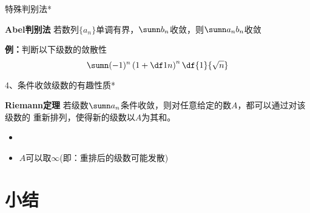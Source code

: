 \begin{frame}{特殊判别法*}
	\linespread{1.5}\pause 
	\begin{block}{{\bf Abel判别法}\hfill}
		若数列$\{a_n\}$单调有界，$\sumn b_n$收敛，则$\sumn a_nb_n$收敛\pause 
	\end{block}
	\bigskip
	\begin{exampleblock}{{\bf 例：}判断以下级数的敛散性\hfill}
		  $$\sumn(-1)^n\left(1+\df 1n\right)^n\df{1}{\sqrt n}$$ 
	\end{exampleblock}
\end{frame}

\begin{frame}{4、条件收敛级数的有趣性质*}
	\linespread{1.2}
	\begin{block}{{\bf Riemann定理}}
		若级数$\sumn a_n$条件收敛，则对任意给定的数$A$，都可以通过对该级数的
		重新排列，使得新的级数以$A$为其和。
	\end{block}
	\pause
	\begin{itemize}
	  \item {}
	  \item $A$可以取$\infty$(即：重排后的级数可能发散)
	\end{itemize}
\end{frame}

\section{小结}

% 		
% 		
% 		
% 		
% 		
% 		
% 		
% 		
% 		

